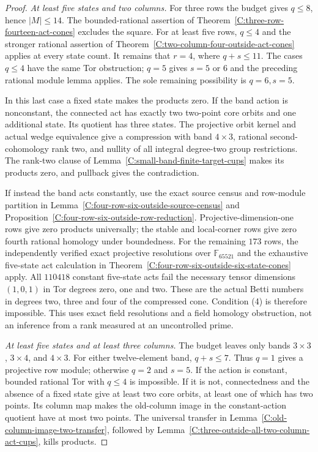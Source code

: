 \begin{proof}
\emph{At least five states and two columns.}
For three rows the budget gives $q\leq8$, hence $|M|\leq14$.
The bounded-rational assertion of
Theorem~\ref{C:three-row-fourteen-act-cones} excludes the square.
For at least five rows, $q\leq4$ and the stronger rational
assertion of Theorem~\ref{C:two-column-four-outside-act-cones}
applies at every state count.
It remains that $r=4$, where $q+s\leq11$.
The cases $q\leq4$ have the same Tor obstruction; $q=5$ gives
$s=5$ or $6$ and the preceding rational module lemma applies.
The sole remaining possibility is $q=6,s=5$.

In this last case a fixed state makes the products zero.
If the band action is nonconstant, the connected act has exactly
two two-point core orbits and one additional state. Its quotient
has three states. The projective orbit kernel and actual wedge
equivalence give a compression with band $4\times3$, rational
second-cohomology rank two, and nullity of all integral degree-two
group restrictions. The rank-two clause of
Lemma~\ref{C:small-band-finite-target-cups} makes its products
zero, and pullback gives the contradiction.

If instead the band acts constantly, use the exact source census
and row-module partition in
Lemma~\ref{C:four-row-six-outside-source-census} and
Proposition~\ref{C:four-row-six-outside-row-reduction}.
Projective-dimension-one rows give zero products universally;
the stable and local-corner rows give zero fourth rational homology
under boundedness. For the remaining $173$ rows, the independently
verified exact projective resolutions over $\mathbb F_{65521}$ and
the exhaustive five-state act calculation in
Theorem~\ref{C:four-row-six-outside-six-state-cones} apply.
All $110418$ constant five-state acts fail the necessary tensor
dimensions $(1,0,1)$ in Tor degrees zero, one and two.
These are the actual Betti numbers in degrees two, three and four
of the compressed cone. Condition (4) is therefore impossible.
This uses exact field resolutions and a field homology obstruction,
not an inference from a rank measured at an uncontrolled prime.

\emph{At least five states and at least three columns.}
The budget leaves only bands $3\times3$, $3\times4$, and $4\times3$.
For either twelve-element band, $q+s\leq7$. Thus $q=1$ gives a
projective row module; otherwise $q=2$ and $s=5$. If the action is
constant, bounded rational Tor with $q\leq4$ is impossible.
If it is not, connectedness and the absence of a fixed state give
at least two core orbits, at least one of which has two points.
Its column map makes the old-column image in the constant-action
quotient have at most two points. The universal transfer in
Lemma~\ref{C:old-column-image-two-transfer}, followed by
Lemma~\ref{C:three-outside-all-two-column-act-cups}, kills products.


\end{proof}
